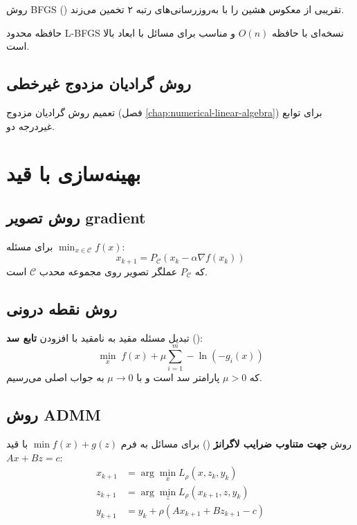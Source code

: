 \documentclass{matinbook}
\begin{document}
    \begin{definition}[BFGS]
        روش BFGS
        ()
        تقریبی از معکوس هشین را
        با به‌روزرسانی‌های رتبه ۲
        تخمین می‌زند.
        \label{def:bfgs}
    \end{definition}
    
    حافظه محدود L-BFGS
    نسخه‌ای با حافظه $O(n)$
    و مناسب برای مسائل با ابعاد بالا است.
    
    \subsection{روش گرادیان مزدوج غیرخطی}
    
    تعمیم روش گرادیان مزدوج
    (فصل \ref{chap:numerical-linear-algebra})
    برای توابع غیردرجه دو.
    
    \section{بهینه‌سازی با قید}
    
    \subsection{روش تصویر gradient}
    
    برای مسئله $\min_{x \in \mathcal{C}} f(x)$:
    \[
    x_{k+1} = P_{\mathcal{C}}(x_{k} - \alpha \nabla f(x_{k}))
    \]
    که $P_{\mathcal{C}}$ عملگر تصویر
    روی مجموعه محدب $\mathcal{C}$ است.
    
    \subsection{روش نقطه درونی}
    
    \begin{definition}
        تبدیل مسئله مقید به نامقید
        با افزودن \textbf{تابع سد} ():
        \[
        \min_{x} \; f(x) + \mu \sum_{i=1}^{m} -\ln(-g_{i}(x))
        \]
        که $\mu > 0$ پارامتر سد است
        و با $\mu \to 0$ به جواب اصلی می‌رسیم.
        \label{def:interior-point}
    \end{definition}
    
    \subsection{روش ADMM}
    
    \begin{definition}[ADMM]
        روش \textbf{جهت متناوب ضرایب لاگرانژ}
        ()
        برای مسائل به فرم
        $\min f(x) + g(z)$ با قید $Ax + Bz = c$:
        \begin{align*}
            x_{k+1} &= \arg\min_{x} L_{\rho}(x, z_{k}, y_{k}) \\
            z_{k+1} &= \arg\min_{z} L_{\rho}(x_{k+1}, z, y_{k}) \\
            y_{k+1} &= y_{k} + \rho(Ax_{k+1} + Bz_{k+1} - c)
        \end{align*}
        \label{def:admm}
    \end{definition}
    
\end{document}
